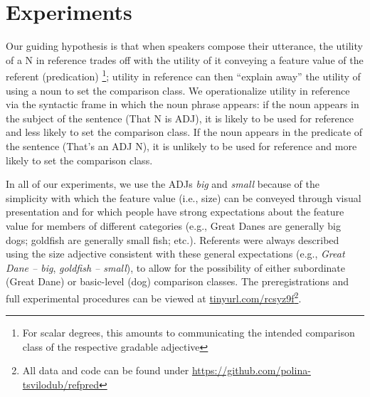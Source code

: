\documentclass[10pt,letterpaper]{article}
\begin{document}
\section{Experiments}
Our guiding hypothesis is that when speakers compose their utterance, the utility of a N in reference trades off with the utility of it conveying a feature value of the referent (predication) \footnote{For scalar degrees, this amounts to communicating the intended comparison class of the respective gradable adjective}; utility in reference can then ``explain away'' the utility of using a noun to set the comparison class. 
We operationalize utility in reference via the syntactic frame in which the noun phrase appears: if the noun appears in the subject of the sentence (That N is ADJ), it is likely to be used for reference and less likely to set the comparison class. If the noun appears in the predicate of the sentence (That's an ADJ N), it is unlikely to be used for reference and more likely to set the comparison class. 

In all of our experiments, we use the ADJs \emph{big} and \emph{small} because of the simplicity with which the feature value (i.e., size) can be conveyed through visual presentation and for which people have strong expectations about the feature value for members of different categories (e.g., Great Danes are generally big dogs; goldfish are generally small fish; etc.). 
Referents were always described using the size adjective consistent with these general expectations (e.g., \emph{Great Dane -- big}, \emph{goldfish -- small}), to allow for the possibility of either subordinate (Great Dane) or basic-level (dog) comparison classes.
The preregistrations and full experimental procedures can be viewed at \url{tinyurl.com/rcsyz9f}\footnote{All data and code can be found under \url{https://github.com/polina-tsvilodub/refpred}}.

\end{document}
